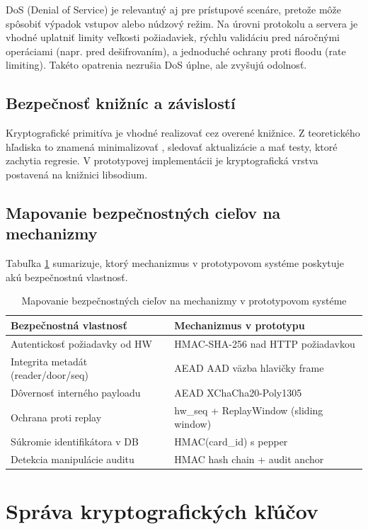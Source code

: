 \documentclass[journal,a4paper,onecolumn]{IEEEtran}
\begin{document}
DoS (Denial of Service) je relevantný aj pre prístupové scenáre, pretože môže spôsobiť výpadok vstupov alebo núdzový režim. Na úrovni protokolu a servera je vhodné uplatniť limity veľkosti požiadaviek, rýchlu validáciu pred náročnými operáciami (napr. pred dešifrovaním), a jednoduché ochrany proti floodu (rate limiting). Takéto opatrenia nezrušia DoS úplne, ale zvyšujú odolnosť.

\subsection{Bezpečnosť knižníc a závislostí}

Kryptografické primitíva je vhodné realizovať cez overené knižnice. Z teoretického hľadiska to znamená minimalizovať , sledovať aktualizácie a mať testy, ktoré zachytia regresie. V prototypovej implementácii je kryptografická vrstva postavená na knižnici libsodium.\cite{LibsodiumXChaChaDoc}

\subsection{Mapovanie bezpečnostných cieľov na mechanizmy}

Tabuľka \ref{tab:security-mapping} sumarizuje, ktorý mechanizmus v prototypovom systéme poskytuje akú bezpečnostnú vlastnosť.

\begin{table}[h]
\centering
\begin{tabular}{@{}ll@{}}
\toprule
Bezpečnostná vlastnosť & Mechanizmus v prototypu \\
\midrule
Autentickosť požiadavky od HW & HMAC-SHA-256 nad HTTP požiadavkou \\
Integrita metadát (reader/door/seq) & AEAD AAD väzba hlavičky frame \\
Dôvernosť interného payloadu & AEAD XChaCha20-Poly1305 \\
Ochrana proti replay & hw\_seq + ReplayWindow (sliding window) \\
Súkromie identifikátora v DB & HMAC(card\_id) s pepper \\
Detekcia manipulácie auditu & HMAC hash chain + audit anchor \\
\bottomrule
\end{tabular}
\caption{Mapovanie bezpečnostných cieľov na mechanizmy v prototypovom systéme}
\label{tab:security-mapping}
\end{table}

\section{Správa kryptografických kľúčov}
\end{document}
